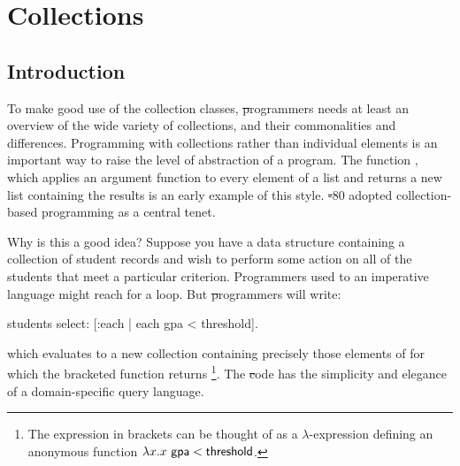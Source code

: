 \documentclass[a4paper,10pt,twoside]{book}
\begin{document}
	\renewcommand{\nnbb}[2]{} %
\fi
\chapter{Collections}
\label{cha:collections}

\section{Introduction}

To make good use of the collection classes, \st programmers needs at least an overview of the wide variety of collections, and their commonalities and differences.
%
Programming with collections rather than individual elements is an important way to raise the level of abstraction of a program.
The  function , which applies an argument function to every element of a list and returns a new list containing the results is an early example of this style. \st-80 adopted collection-based programming as a central tenet.


Why is this a good idea?
Suppose you have a data structure containing a collection of student records and wish to perform some action on all of the students that meet a particular criterion.
Programmers used to an imperative language might reach for a loop.
But \st programmers will write:
\begin{code}{}
students select: [:each | each gpa < threshold].
\end{code}
\noindent
which evaluates to a new collection containing precisely those elements of  for which the bracketed function returns \footnote{The expression in brackets can be thought of as a $\lambda$-expression defining an anonymous function $\lambda x. x~{\sf gpa} < {\sf threshold}$.
}.
The \st code has the simplicity and elegance of a domain-specific query language.
\end{document}
